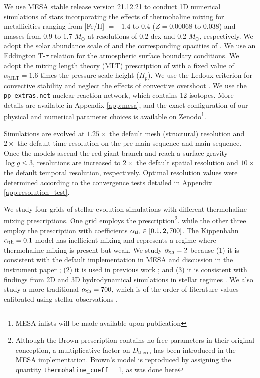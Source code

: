 %
%
%
We use MESA stable release version 21.12.21 to conduct 1D numerical simulations of stars incorporating the effects of thermohaline mixing for metallicities ranging from [Fe/H] $= -1.4$ to $0.4$ ($Z = 0.00068$ to $0.038$) and masses from 0.9 to 1.7 $M_{\odot}$ at resolutions of 0.2 dex and 0.2 $M_{\odot}$, respectively. We adopt the solar abundance scale of \citet{GrevesseSauval1998} and the corresponding opacities of \citet{IglesiasRogers1996}. We use an Eddington T-$\tau$ relation for the atmospheric surface boundary conditions.
We adopt the mixing length theory (MLT) prescription of \citet{Cox1980} with a fixed value of $\alpha_{\text{MLT}}= 1.6$ times the pressure scale height ($H_p$). We use the Ledoux criterion for convective stability and neglect the effects of convective overshoot \citep{Ledoux1947}. We use the \verb|pp_extras.net| nuclear reaction network, which contains 12 isotopes. More details are available in Appendix \ref{app:mesa}, and the exact configuration of our physical and numerical parameter choices is available on Zenodo\footnote{MESA inlists will be made available upon publication}. 

Simulations are evolved at $1.25\times$ the default mesh (structural) resolution and $2\times$ the default time resolution on the pre-main sequence and main sequence. Once the models ascend the red giant branch and reach a surface gravity $\log g \le 3$, resolutions are increased to $2\times$ the default spatial resolution and $10\times$ the default temporal resolution, respectively. Optimal resolution values were determined according to the convergence tests detailed in Appendix \ref{app:resolution_test}. 

We study four grids of stellar evolution simulations with different thermohaline mixing prescriptions. One grid employs the \citet{brown_etal_2013} prescription\footnote{Although the Brown prescription contains no free parameters in their original conception, a multiplicative factor on $D_{\text{therm}}$ has been introduced in the MESA implementation. Brown's model is reproduced by assigning the quantity \texttt{thermohaline\_coeff} = 1, as was done here}. 
%
while the other three employ the \citet{kippenhahn_etal_1980} prescription with coefficients $\alpha_{\rm th} \in [0.1, 2, 700]$.
The Kippenhahn $\alpha_{\rm th} = 0.1$ model has inefficient mixing and represents a regime where thermohaline mixing is present but weak.
We study $\alpha_{\rm th} = 2$ because (1) it is consistent with the default implementation in MESA and discussion in the instrument paper \citep{mesa2}; (2) it is used in previous work \citep{CantielloLanger2010, TayarJoyce22}; and (3) it is consistent with findings from 2D and 3D hydrodynamical simulations in stellar regimes 
\citep{Denissenkov2010, traxler_etal_2011, brown_etal_2013}. We also study a more traditional $\alpha_{\rm th} = 700$, which is of the order of literature values calibrated 
using stellar observations \citep{lattanzio_etal_2015, charbonnel_thermohaline_2007}.

